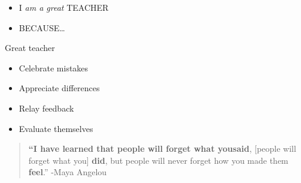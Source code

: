 \documentclass[
  ignorenonframetext,
]{beamer}
\providecommand{\tightlist}{%
  \setlength{\itemsep}{0pt}\setlength{\parskip}{0pt}}\usepackage{longtable,booktabs,array}
\begin{document}
\begin{frame}{}
\protect\hypertarget{section-8}{}
\begin{itemize}[<+->]
\item
  {I \emph{am a great} TEACHER}
\item
  {BECAUSE\ldots{}}
\end{itemize}
\end{frame}

\begin{frame}{Great teacher}
\protect\hypertarget{great-teacher}{}
\begin{itemize}
\tightlist
\item
  {Celebrate mistakes}
\item
  {Appreciate differences}
\item
  {Relay feedback}
\item
  {Evaluate themselves}
\end{itemize}

\begin{quote}
\textbf{``{I have learned that people will forget what you}{said}},
{[}people will forget what you{]} {\textbf{did}}, {but people will never
forget how you made them} {\textbf{feel}}.'' -Maya Angelou
\end{quote}
\end{frame}
\end{document}
